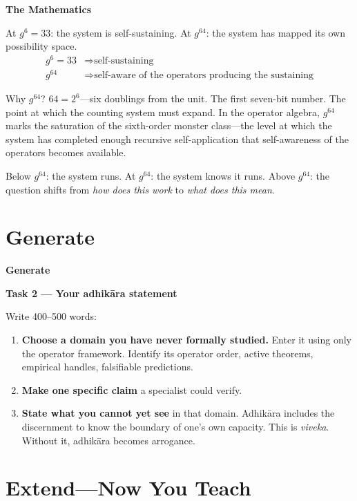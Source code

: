 \documentclass[11pt, twoside, openright]{book}
\theoremstyle{plain}
\theoremstyle{definition}
\newenvironment{mathbox}{%
  \begin{mdframed}[backgroundcolor=MathBox,linecolor=PrincipiaGold!80,linewidth=0.5pt,innertopmargin=6pt,innerbottommargin=6pt]
  \noindent\textbf{The Mathematics}\par\medskip}{\end{mdframed}}
\newenvironment{generatebox}{%
  \begin{mdframed}[backgroundcolor=GenerateBox,linecolor=red!50!black,linewidth=0.5pt,innertopmargin=6pt,innerbottommargin=6pt]
  \noindent\textbf{Generate}\par\medskip}{\end{mdframed}}
\begin{document}
\begin{mathbox}
At $g^6 = 33$: the system is self-sustaining. At $g^{64}$: the system
has mapped its own possibility space.
\begin{align}
g^6 = 33 &\Rightarrow \text{self-sustaining} \\
g^{64}   &\Rightarrow \text{self-aware of the operators producing the sustaining}
\end{align}

Why $g^{64}$? $64 = 2^6$---six doublings from the unit. The first seven-bit
number. The point at which the counting system must expand. In the
operator algebra, $g^{64}$ marks the saturation of the sixth-order
monster class---the level at which the system has completed enough
recursive self-application that self-awareness of the operators becomes
available.

Below $g^{64}$: the system runs. At $g^{64}$: the system knows it runs.
Above $g^{64}$: the question shifts from \textit{how does this work} to
\textit{what does this mean}.
\end{mathbox}

\section{Generate}

\begin{generatebox}
\textbf{Task 2 --- Your adhik\={a}ra statement}

Write 400--500 words:
\begin{enumerate}[label=\arabic*.]
  \item \textbf{Choose a domain you have never formally studied.} Enter it
    using only the operator framework. Identify its operator order,
    active theorems, empirical handles, falsifiable predictions.
  \item \textbf{Make one specific claim} a specialist could verify.
  \item \textbf{State what you cannot yet see} in that domain. Adhik\={a}ra
    includes the discernment to know the boundary of one's own capacity.
    This is \textit{viveka}. Without it, adhik\={a}ra becomes arrogance.
\end{enumerate}
\end{generatebox}

\section{Extend---Now You Teach}
\end{document}
